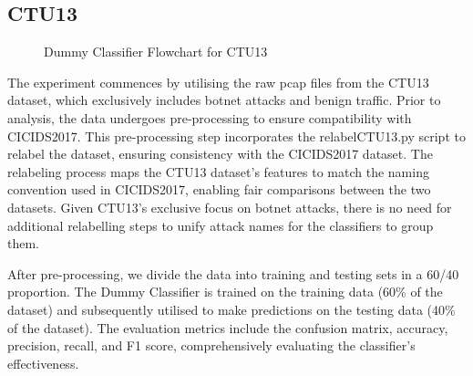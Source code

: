 \subsection{CTU13}\label{subsec:DummyClassifierCTU13}

\begin{figure}[H]
\centering
{}
\caption{Dummy Classifier Flowchart for CTU13}\label{fig:DummyRandomFlowCTU13}
\end{figure}

The experiment commences by utilising the raw pcap files from the CTU13 dataset, which exclusively includes botnet attacks and benign traffic. Prior to analysis, the data undergoes pre-processing to ensure compatibility with CICIDS2017. This pre-processing step incorporates the relabelCTU13.py script to relabel the dataset, ensuring consistency with the CICIDS2017 dataset. The relabeling process maps the CTU13 dataset's features to match the naming convention used in CICIDS2017, enabling fair comparisons between the two datasets. Given CTU13's exclusive focus on botnet attacks, there is no need for additional relabelling steps to unify attack names for the classifiers to group them.

After pre-processing, we divide the data into training and testing sets in a 60/40 proportion. The Dummy Classifier is trained on the training data (60\% of the dataset) and subsequently utilised to make predictions on the testing data (40\% of the dataset). The evaluation metrics include the confusion matrix, accuracy, precision, recall, and F1 score, comprehensively evaluating the classifier's effectiveness.

